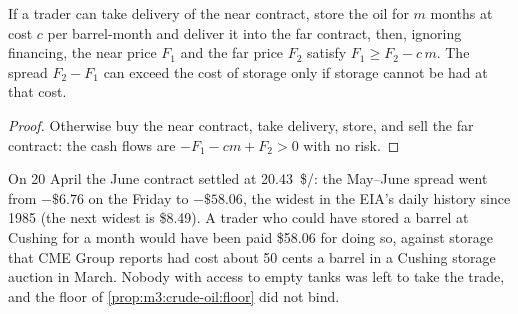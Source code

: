 \begin{proposition}\label{prop:m3:crude-oil:floor}
If a trader can take delivery of the near contract, store the oil for $m$ months at
cost $c$ per barrel-month and deliver it into the far contract, then, ignoring
financing, the near price $F_1$ and the far price $F_2$ satisfy
$F_1 \ge F_2 - c\,m$. The spread $F_2 - F_1$ can exceed the cost of storage only
if storage cannot be had at that cost.
\end{proposition}

\begin{proof}
Otherwise buy the near contract, take delivery, store, and sell the far contract:
the cash flows are $-F_1 - cm + F_2 > 0$ with no risk.
\end{proof}

On 20 April the June contract settled at \qty{20.43}{\$/\barrel}: the May--June
spread went from $-\$6.76$ on the Friday to $-\$58.06$, the widest in the EIA's
daily history since 1985 (the next widest is \$8.49). A trader who could have stored a
barrel at Cushing for a month would have been paid \$58.06 for doing so, against storage that CME Group
reports had cost about 50 cents a barrel in a Cushing storage auction in March. Nobody with
access to empty tanks was left to take the trade, and the floor of
\cref{prop:m3:crude-oil:floor} did not bind.

\begin{omfigure}

\label{fig:m3:crude-oil:spring}
\end{omfigure}

